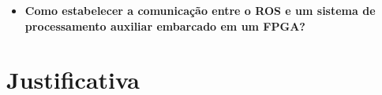 \begin{itemize}
    \item \textbf{Como estabelecer a comunicação entre o ROS e um sistema de processamento auxiliar 
embarcado em um FPGA?}

\end{itemize}














\section{Justificativa}




